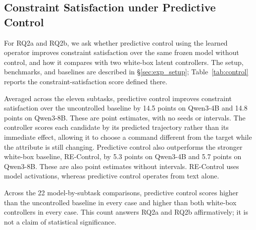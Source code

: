 \subsection{Constraint Satisfaction under Predictive Control}
\label{sec:exp_control}

For RQ2a and RQ2b, we ask whether predictive control using the learned operator improves constraint satisfaction over the same frozen model without control, and how it compares with two white-box latent controllers. The setup, benchmarks, and baselines are described in \S\ref{sec:exp_setup}; Table~\ref{tab:control} reports the constraint-satisfaction score defined there.

Averaged across the eleven subtasks, predictive control improves constraint satisfaction over the uncontrolled baseline by 14.5 points on Qwen3-4B and 14.8 points on Qwen3-8B. These are point estimates, with no seeds or intervals. The controller scores each candidate by its predicted trajectory rather than its immediate effect, allowing it to choose a command different from the target while the attribute is still changing.
Predictive control also outperforms the stronger white-box baseline, RE-Control, by 5.3 points on Qwen3-4B and 5.7 points on Qwen3-8B. These are also point estimates without intervals. RE-Control uses model activations, whereas predictive control operates from text alone.

Across the 22 model-by-subtask comparisons, predictive control scores higher than the uncontrolled baseline in every case and higher than both white-box controllers in every case. This count answers RQ2a and RQ2b affirmatively; it is not a claim of statistical significance.

